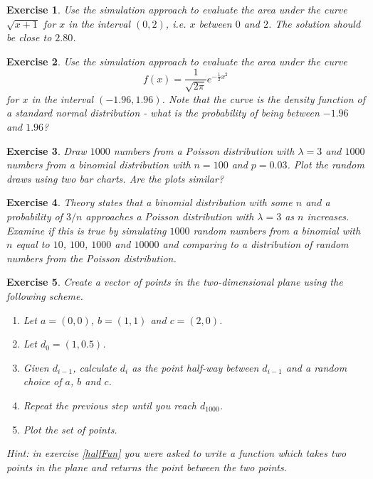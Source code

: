 \documentclass{article}\usepackage[]{graphicx}\usepackage[]{color}
\newtheorem{exercise}{Exercise}[section]
\begin{document}
\begin{exercise}
Use the simulation approach to evaluate the area under the curve $\sqrt{x+1}$ for $x$ in the interval $(0,2)$, i.e. $x$ between $0$ and $2$. The solution should be close to $2.80$.
\end{exercise}

\begin{exercise}
Use the simulation approach to evaluate the area under the curve 
\begin{equation}
f(x) = \frac{1}{\sqrt{2 \pi}} e^{-\frac{1}{2} x^2}
\end{equation}
for $x$ in the interval $(-1.96,1.96)$. Note that the curve is the density function of a standard normal distribution - what is the probability of being between $-1.96$ and $1.96$?
\end{exercise}

\begin{exercise}
Draw $1000$ numbers from a Poisson distribution with $\lambda = 3$ and $1000$ numbers from a binomial distribution with $n=100$ and $p = 0.03$. Plot the random draws using two bar charts. Are the plots similar?
\end{exercise}

\begin{exercise}
Theory states that a binomial distribution with some $n$ and a probability of $3/n$ approaches a Poisson distribution with $\lambda=3$ as $n$ increases. Examine if this is true by simulating $1000$ random numbers from a binomial with $n$ equal to $10$, $100$, $1000$ and $10000$ and comparing to a distribution of random numbers from the Poisson distribution.
\end{exercise}

\begin{exercise}
Create a vector of points in the two-dimensional plane using the following scheme. 
\begin{enumerate}
\item Let $a=(0,0)$, $b=(1,1)$ and $c=(2,0)$.
\item Let $d_0 = (1,0.5)$.
\item Given $d_{i-1}$, calculate $d_i$ as the point half-way between $d_{i-1}$ and a random choice of $a$, $b$ and $c$.
\item Repeat the previous step until you reach $d_{1000}$.
\item Plot the set of points.
\end{enumerate}
Hint: in exercise \ref{halfFun} you were asked to write a function which takes two points in the plane and returns the point between the two points.
\end{exercise}
\end{document}
